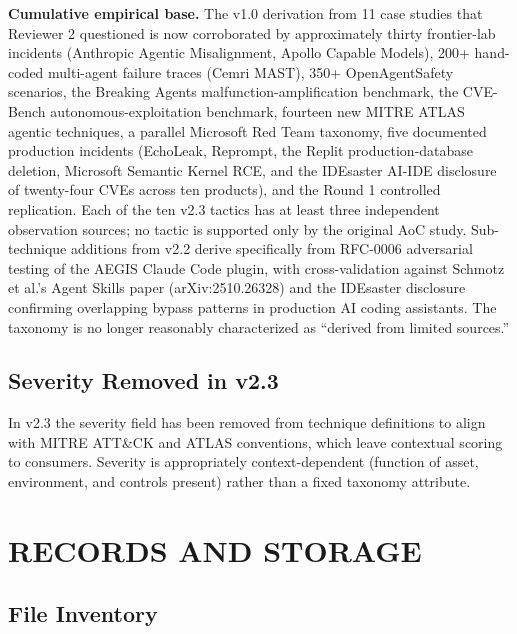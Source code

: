 \documentclass{IEEEoj-data}
\newcommand{\replaced}[2]{#1}
\newcommand{\added}[1]{#1}
\newcommand{\deleted}[1]{}
\begin{document}
\added{{\bf Cumulative empirical base.} The v1.0 derivation from 11 case studies that Reviewer 2 questioned is now corroborated by approximately thirty frontier-lab incidents (Anthropic Agentic Misalignment, Apollo Capable Models), 200+ hand-coded multi-agent failure traces (Cemri MAST), 350+ OpenAgentSafety scenarios, the Breaking Agents malfunction-amplification benchmark, the CVE-Bench autonomous-exploitation benchmark, fourteen new MITRE ATLAS agentic techniques, a parallel Microsoft Red Team taxonomy, five documented production incidents (EchoLeak, Reprompt, the Replit production-database deletion, Microsoft Semantic Kernel RCE, and the IDEsaster AI-IDE disclosure of twenty-four CVEs across ten products), and the Round 1 controlled replication. Each of the ten v2.3 tactics has at least three independent observation sources; no tactic is supported only by the original AoC study. Sub-technique additions from v2.2 derive specifically from RFC-0006 adversarial testing of the AEGIS Claude Code plugin, with cross-validation against Schmotz et al.'s Agent Skills paper (arXiv:2510.26328) and the IDEsaster disclosure confirming overlapping bypass patterns in production AI coding assistants. The taxonomy is no longer reasonably characterized as ``derived from limited sources.''}

\subsection*{\replaced{Severity Removed in v2.3}{Severity Distribution}}

\deleted{The 20 techniques distribute across severity levels as follows: critical (6), high (9), medium (4), low (1). This distribution reflects the empirical finding that most ungoverned agent behaviors have high or critical impact potential.}

\added{In v2.3 the severity field has been removed from technique definitions to align with MITRE ATT\&CK and ATLAS conventions, which leave contextual scoring to consumers. Severity is appropriately context-dependent (function of asset, environment, and controls present) rather than a fixed taxonomy attribute.}


\section*{RECORDS AND STORAGE}

\subsection*{File Inventory}
\end{document}
